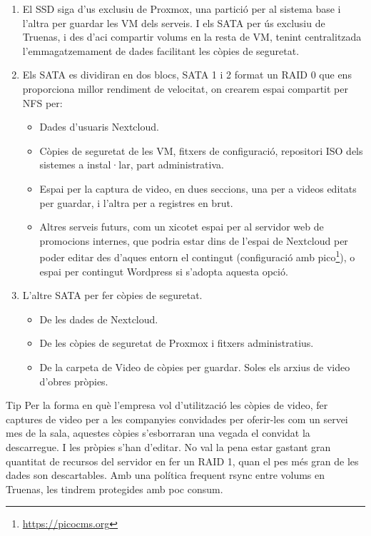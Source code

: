 \documentclass[
  10pt,
]{krantz}
\DeclareRobustCommand{\href}[2]{#2\footnote{\url{#1}}}
\providecommand{\tightlist}{%
  \setlength{\itemsep}{0pt}\setlength{\parskip}{0pt}}
\begin{document}
\begin{enumerate}
\def\labelenumi{\arabic{enumi}.}
\item
  El SSD siga d'us exclusiu de Proxmox, una partició per al sistema base i l'altra per guardar les VM dels serveis. I els SATA per ús exclusiu de Truenas, i des d'aci compartir volums en la resta de VM, tenint centralitzada l'emmagatzemament de dades facilitant les còpies de seguretat.
\item
  Els SATA es dividiran en dos blocs, SATA 1 i 2 format un RAID 0 que ens proporciona millor rendiment de velocitat, on crearem espai compartit per NFS per:

  \begin{itemize}
  \tightlist
  \item
    Dades d'usuaris Nextcloud.
  \item
    Còpies de seguretat de les VM, fitxers de configuració, repositori ISO dels sistemes a instal·lar, part administrativa.
  \item
    Espai per la captura de video, en dues seccions, una per a videos editats per guardar, i l'altra per a registres en brut.
  \item
    Altres serveis futurs, com un xicotet espai per al servidor web de promocions internes, que podria estar dins de l'espai de Nextcloud per poder editar des d'aques entorn el contingut (configuració amb \href{https://picocms.org}{pico}), o espai per contingut Wordpress si s'adopta aquesta opció.
  \end{itemize}
\item
  L'altre SATA per fer còpies de seguretat.

  \begin{itemize}
  \tightlist
  \item
    De les dades de Nextcloud.
  \item
    De les còpies de seguretat de Proxmox i fitxers administratius.
  \item
    De la carpeta de Video de còpies per guardar. Soles els arxius de video d'obres pròpies.
  \end{itemize}
\end{enumerate}

\begin{rmdtip}{Tip}
Per la forma en què l'empresa vol d'utilització les còpies de video, fer captures de video per a les companyies convidades per oferir-les com un servei mes de la sala, aquestes còpies s'esborraran una vegada el convidat la descarregue. I les pròpies s'han d'editar. No val la pena estar gastant gran quantitat de recursos del servidor en fer un RAID 1, quan el pes més gran de les dades son descartables. Amb una política frequent rsync entre volums en Truenas, les tindrem protegides amb poc consum.

\end{rmdtip}
\end{document}
